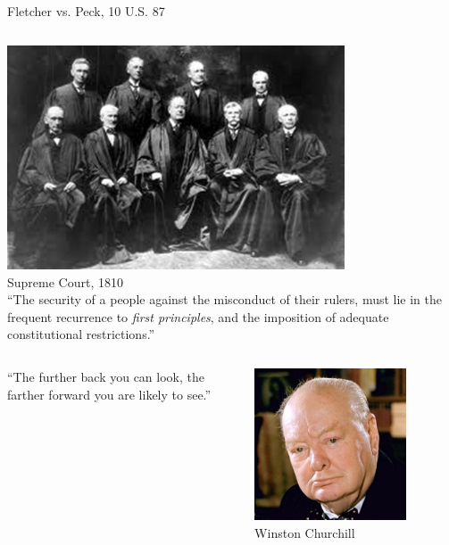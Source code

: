 \documentclass{beamer}
\begin{document}
\begin{frame}{Fletcher vs. Peck, 10 U.S. 87}
    \begin{columns}[onlytextwidth]
            \centering
            \includegraphics[width=0.75\textwidth]{img/supreme-court-1810.png} \\
            Supreme Court, 1810 \\

            ``The security of a people against the misconduct of their rulers,
            must lie in the frequent recurrence to \emph{first principles}, and
            the imposition of adequate constitutional restrictions.''
    \end{columns}
\end{frame}

\begin{frame}
    \begin{columns}[onlytextwidth]
            ``The further back you can look, the farther forward you are likely to see.''

            \centering
            \includegraphics[width=0.75\textwidth]{img/winston-churchill.png} \\
            Winston Churchill \\
    \end{columns}
\end{frame}
\end{document}

